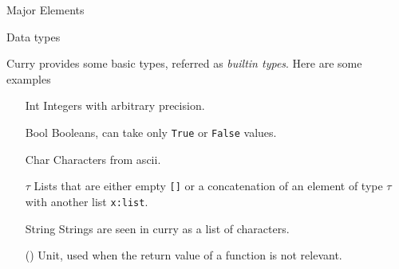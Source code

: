 \documentclass{beamer}
\newcommand{\q}[1]{\texttt{#1}}
\begin{document}
\begin{section}{Major Elements}
\begin{subsection}{Data types}
    \begin{frame}
      Curry provides some basic types, referred as \textit{builtin types}.
      Here
      are some examples
      \begin{itemize}
      \item[Int] Integers with arbitrary precision.
      \item[Bool] Booleans, can take only \q{True} or \q{False} values.
      \item[Char] Characters from ascii.
      \item[\lbrack$\tau$\rbrack ] Lists that are either empty \q{[]} or a
        concatenation of an element of type $\tau$ with another list
        \q{x:list}.
      \item[String] Strings are seen in curry as a list of characters.
      \item[()] Unit, used when the return value of a function is not
        relevant.
      \end{itemize}

    \end{frame}
  \end{subsection}  
\end{section}
\end{document}
